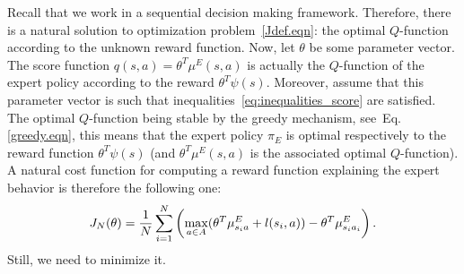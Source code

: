 \documentclass[tablecaption=bottom]{jmlr}
\begin{document}
Recall that we work in a sequential decision making framework.
Therefore, there is a natural solution to optimization
problem~\eqref{Jdef.eqn}: the optimal $Q$-function according to the
unknown reward function. Now, let $\theta$ be some parameter vector.
The score function $q(s,a) = \theta^T \mu^E(s,a)$ is actually the
$Q$-function of the expert policy according to the reward
$\theta^T\psi(s)$. Moreover, assume that this parameter vector is
such that inequalities~\eqref{eq:inequalities_score} are satisfied.
The optimal $Q$-function being stable by the greedy mechanism,
see~Eq.\eqref{greedy.eqn}, this means that the expert policy $\pi_E$
is optimal respectively to the reward function $\theta^T\psi(s)$
(and $\theta^T\mu^E(s,a)$ is the associated optimal $Q$-function). A
natural cost function for computing a reward function explaining the
expert behavior is therefore the following one:
\begin{equation}
\label{structure.eqn} J_N(\theta)  = {1\over N}
\sum_{i=1}^N\left(\max_{a\in A}(\theta ^T \mu^E_{s_ia} + l(s_i,a)) -
\theta ^T \mu^E_{s_ia_i} \right).
\end{equation}
Still, we need to minimize it.
\end{document}
